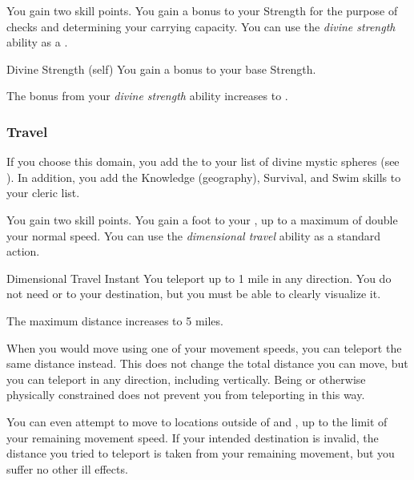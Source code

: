              You gain two skill points.
             You gain a  bonus to your Strength for the purpose of checks and determining your carrying capacity.
             You can use the \textit{divine strength} ability as a .
            \begin{attuneability}{Divine Strength}
                 (self)
                \rankline
                You gain a  bonus to your base Strength.
            \end{attuneability}
             The bonus from your \textit{divine strength} ability increases to .

        \subsubsection{Travel}
            If you choose this domain, you add the   to your list of divine mystic spheres (see ).
            In addition, you add the Knowledge (geography), Survival, and Swim skills to your cleric  list.

             You gain two skill points.
             You gain a  foot  to your , up to a maximum of double your normal speed.
             You can use the \textit{dimensional travel} ability as a standard action.
            \begin{instantability}{Dimensional Travel}
                Instant
                \rankline
                You teleport up to 1 mile in any direction.
                You do not need  or  to your destination, but you must be able to clearly visualize it.

                \rankline
                 The maximum distance increases to 5 miles.
            \end{instantability}
             When you would move using one of your movement speeds, you can teleport the same distance instead.
            This does not change the total distance you can move, but you can teleport in any direction, including vertically.
            Being \grappled or otherwise physically constrained does not prevent you from teleporting in this way.

            You can even attempt to move to locations outside of  and , up to the limit of your remaining movement speed.
            If your intended destination is invalid, the distance you tried to teleport is taken from your remaining movement, but you suffer no other ill effects.

